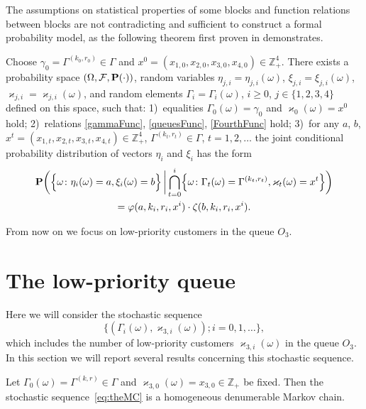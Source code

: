 \documentclass[runningheads,a4paper]{llncs}
\begin{document}
The assumptions on statistical properties of some blocks and function relations between blocks are
not contradicting and sufficient to construct a formal probability model, as the following theorem
first proven in \cite{k:z:02:2015} demonstrates.
\begin{theorem}\label{thm1}
  Choose $\gamma_0=\Gamma^{(k_0,r_0)}\in \Gamma$ and $x^0=(x_{1,0},x_{2,0}, x_{3,0},x_{4,0})\in
  \mathbb{Z}_+^4$.  There exists a probability space $(\Omega, {\cal F}, {\mathbf P}(\cdot))$, random
  variables $\eta_{j,i}=\eta_{j,i}(\omega)$, $\xi_{j,i}=\xi_{j,i}(\omega)$,
  $\varkappa_{j,i}=\varkappa_{j,i}(\omega)$, and random elements $\Gamma_i=\Gamma_i(\omega)$,
  $i\geqslant 0$, $j\in \{1, 2, 3, 4\}$  defined on this space, such that: 1)~equalities
  $\Gamma_0(\omega) = \gamma_0$ and $\varkappa_0(\omega)=x^0$ hold; 2)~relations
  \eqref{gammaFunc}, \eqref{queuesFunc}, \eqref{FourthFunc} hold; 3)~for any $a$, $b$,
  $x^t=(x_{1,t},x_{2,t},x_{3,t},x_{4,t}) \in \mathbb{Z}_+^4$, $\Gamma^{(k_t,r_t)} \in \Gamma$, $t =
  1, 2, \ldots$ the joint conditional probability distribution of vectors $\eta_i$ and $\xi_i$ has the form
  \begin{multline*}
    {\mathbf P} \biggl(\Bigl\{ \omega \colon \eta_i(\omega) = a, \xi_i(\omega)=b\Bigr\}\,
    \bigg|\bigcap_{t=0}^{i}\Bigl\{\omega\colon \Gamma_t(\omega)=\Gamma^{(k_t,r_t)},
    \varkappa_t(\omega)=x^t\Bigr\}\biggr)
    \\ =    \varphi(a,k_i,r_i,x^i) \cdot \zeta(b,k_i,r_i,x^i).
    \label{ProbablititiesToProve}
  \end{multline*}
\label{myTheorem}
\end{theorem}
From now on we focus on low-priority customers in the queue $O_3$. 

\section{The low-priority queue}

Here we will consider the stochastic sequence
\begin{equation}
\label{eq:theMC}
\{(\Gamma_i(\omega), \varkappa_{3, i}(\omega)); i =0, 1, \ldots\},
\end{equation}
which includes the number of low-priority customers $\varkappa_{3, i}(\omega)$ in the queue $O_3$.  In this
section we will report several results concerning this stochastic sequence.

\begin{theorem}
  Let $\Gamma_0(\omega)=\Gamma^{(k,r)}\in \Gamma$ and $\varkappa_{3,0}(\omega)=x_{3,0}\in
  \mathbb{Z}_+$ be fixed. Then the stochastic sequence~\eqref{eq:theMC} is a
  homogeneous denumerable Markov chain.
\end{theorem}
\end{document}
